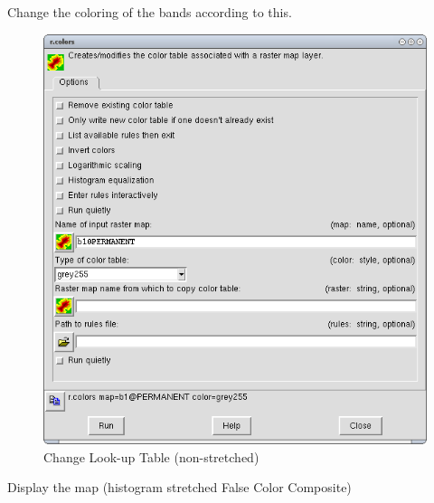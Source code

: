 Change the coloring of the bands according to this.

\begin{figure}[htbp]
   \centering
   \includegraphics[scale=0.35]{grass_rs006.png}
   \caption{Change Look-up Table (non-stretched)}
   \label{fig:grass_rs006}
\end{figure}

Display the map (histogram stretched False Color Composite)

